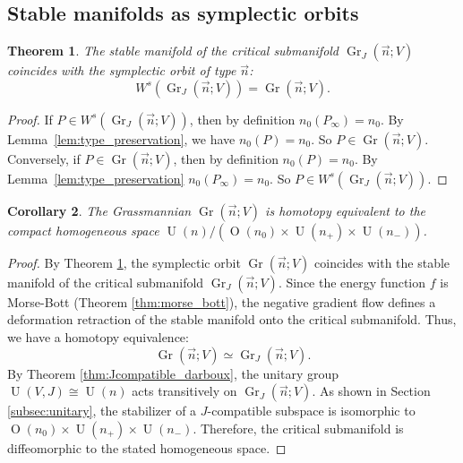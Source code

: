 \documentclass[12pt, final]{article}
\def\U{\operatorname{U}}
\def\O{\operatorname{O}}
\def\Gr{\operatorname{Gr}}
\newtheorem{theorem}{Theorem}[section]
\newtheorem{corollary}[theorem]{Corollary}
\begin{document}
\subsection{Stable manifolds as symplectic orbits}
\label{subsec:stable_manifolds}

\begin{theorem}
\label{thm:stable_orbits}
The stable manifold of the critical submanifold $\Gr_J(\vec{n}; V)$ coincides with the symplectic orbit of type $\vec{n}$:
\[ W^s(\Gr_J(\vec{n}; V)) = \Gr(\vec{n}; V). \]
\end{theorem}

\begin{proof}
If $P \in W^s(\Gr_J(\vec{n}; V))$, then by definition $n_0(P_\infty) = n_0$. By Lemma~\ref{lem:type_preservation}, we have $n_0(P) = n_0$. So $P \in \Gr(\vec{n}; V)$.
Conversely, if $P \in \Gr(\vec{n}; V)$, then by definition $n_0(P) = n_0$. By Lemma~\ref{lem:type_preservation} $n_0(P_\infty) = n_0$. So $P \in W^s(\Gr_J(\vec{n}; V))$.
\end{proof}

\begin{corollary}\label{cor:def_retraction}
    The Grassmannian $\Gr(\vec{n}; V)$ is homotopy equivalent to the compact homogeneous space $\U(n)/(\O(n_0) \times \U(n_+) \times \U(n_-))$.
\end{corollary}

\begin{proof}
By Theorem \ref{thm:stable_orbits}, the symplectic orbit $\Gr(\vec{n}; V)$ coincides with the stable manifold of the critical submanifold $\Gr_J(\vec{n}; V)$. Since the energy function $f$ is Morse-Bott (Theorem \ref{thm:morse_bott}), the negative gradient flow defines a deformation retraction of the stable manifold onto the critical submanifold. Thus, we have a homotopy equivalence:
\[
\Gr(\vec{n}; V) \simeq \Gr_J(\vec{n}; V).
\]
By Theorem \ref{thm:Jcompatible_darboux}, the unitary group $\U(V, J) \cong \U(n)$ acts transitively on $\Gr_J(\vec{n}; V)$. As shown in Section \ref{subsec:unitary}, the stabilizer of a $J$-compatible subspace is isomorphic to $\O(n_0) \times \U(n_+) \times \U(n_-)$. Therefore, the critical submanifold is diffeomorphic to the stated homogeneous space.
\end{proof}

\printbibliography
\end{document}
